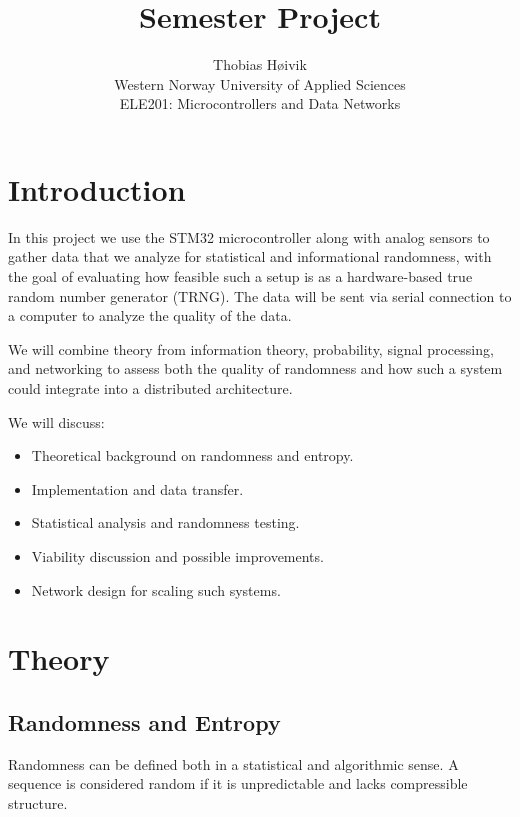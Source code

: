 
\usepackage{graphicx}



\title{\huge{Semester Project}}
\author{\LARGE{Thobias Høivik} 
    \\ \large{Western Norway University of Applied Sciences} 
\\ \large{ELE201: Microcontrollers and Data Networks}}
\date{}


\maketitle

\newpage
\tableofcontents

\newpage
\section{Introduction}
In this project we use the STM32 microcontroller along with analog 
sensors 
to gather data that we analyze for statistical and informational 
randomness, 
with the goal of evaluating how feasible such a setup is as a 
hardware-based true random number generator (TRNG). 
The data will be sent via serial connection to a computer 
to analyze the quality of the data.

We will combine theory from information theory, probability, 
signal processing, and networking to assess both the quality of 
randomness 
and how such a system could integrate into a distributed architecture.

We will discuss:
\begin{itemize}
    \item Theoretical background on randomness and entropy.
    \item Implementation and data transfer.
    \item Statistical analysis and randomness testing.
    \item Viability discussion and possible improvements.
    \item Network design for scaling such systems.
\end{itemize}

\newpage
\section{Theory}
\subsection{Randomness and Entropy}
Randomness can be defined both in a statistical and algorithmic sense. 
A sequence is considered random if it is unpredictable and lacks 
compressible structure.

